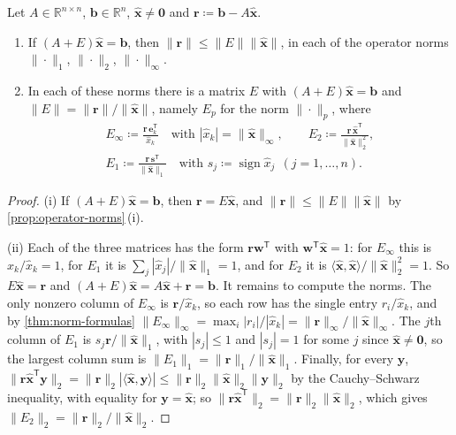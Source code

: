 \begin{proposition}
\label{prop:residual}
Let $A\in\mathbb R^{n\times n}$, $\mathbf b\in\mathbb R^n$, $\hat{\mathbf x}\ne\mathbf 0$ and $\mathbf r\coloneqq\mathbf b-A\hat{\mathbf x}$.
\begin{enumerate}
\item If $(A+E)\hat{\mathbf x}=\mathbf b$, then $\|\mathbf r\|\le\|E\|\|\hat{\mathbf x}\|$, in each of the operator norms $\|\cdot\|_1$, $\|\cdot\|_2$, $\|\cdot\|_\infty$.
\item In each of these norms there is a matrix $E$ with $(A+E)\hat{\mathbf x}=\mathbf b$ and $\|E\|=\|\mathbf r\|/\|\hat{\mathbf x}\|$, namely $E_p$ for the norm $\|\cdot\|_p$, where
\[
\begin{gathered}
E_\infty\coloneqq\frac{\mathbf r\,\mathbf e_k^{\mathsf T}}{\hat x_k}\quad\text{with }|\hat x_k|=\|\hat{\mathbf x}\|_\infty,\qquad
E_2\coloneqq\frac{\mathbf r\,\hat{\mathbf x}^{\mathsf T}}{\|\hat{\mathbf x}\|_2^2},\\
E_1\coloneqq\frac{\mathbf r\,\mathbf s^{\mathsf T}}{\|\hat{\mathbf x}\|_1}\quad\text{with }s_j\coloneqq\operatorname{sign}\hat x_j\ \ (j=1,\ldots,n).
\end{gathered}
\]
\end{enumerate}
\end{proposition}

\begin{proof}
(i) If $(A+E)\hat{\mathbf x}=\mathbf b$, then $\mathbf r=E\hat{\mathbf x}$, and $\|\mathbf r\|\le\|E\|\|\hat{\mathbf x}\|$ by \cref{prop:operator-norms}\,(i).

(ii) Each of the three matrices has the form $\mathbf r\mathbf w^{\mathsf T}$ with $\mathbf w^{\mathsf T}\hat{\mathbf x}=1$: for $E_\infty$ this is $\hat x_k/\hat x_k=1$, for $E_1$ it is $\sum_j|\hat x_j|/\|\hat{\mathbf x}\|_1=1$, and for $E_2$ it is $\langle\hat{\mathbf x},\hat{\mathbf x}\rangle/\|\hat{\mathbf x}\|_2^2=1$. So $E\hat{\mathbf x}=\mathbf r$ and $(A+E)\hat{\mathbf x}=A\hat{\mathbf x}+\mathbf r=\mathbf b$. It remains to compute the norms. The only nonzero column of $E_\infty$ is $\mathbf r/\hat x_k$, so each row has the single entry $r_i/\hat x_k$, and by \cref{thm:norm-formulas} $\|E_\infty\|_\infty=\max_i|r_i|/|\hat x_k|=\|\mathbf r\|_\infty/\|\hat{\mathbf x}\|_\infty$. The $j$th column of $E_1$ is $s_j\mathbf r/\|\hat{\mathbf x}\|_1$, with $|s_j|\le1$ and $|s_j|=1$ for some $j$ since $\hat{\mathbf x}\ne\mathbf 0$, so the largest column sum is $\|E_1\|_1=\|\mathbf r\|_1/\|\hat{\mathbf x}\|_1$. Finally, for every $\mathbf y$, $\|\mathbf r\hat{\mathbf x}^{\mathsf T}\mathbf y\|_2=\|\mathbf r\|_2|\langle\hat{\mathbf x},\mathbf y\rangle|\le\|\mathbf r\|_2\|\hat{\mathbf x}\|_2\|\mathbf y\|_2$ by the Cauchy--Schwarz inequality, with equality for $\mathbf y=\hat{\mathbf x}$; so $\|\mathbf r\hat{\mathbf x}^{\mathsf T}\|_2=\|\mathbf r\|_2\|\hat{\mathbf x}\|_2$, which gives $\|E_2\|_2=\|\mathbf r\|_2/\|\hat{\mathbf x}\|_2$.
\end{proof}

